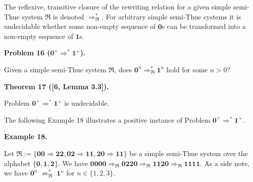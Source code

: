  
 
 
The reflexive, transitive closure of the rewriting relation for a given simple semi-Thue system $\mathfrak{R}$ is denoted $\Rightarrow_{\mathfrak{R}}^{*}$. For arbitrary simple semi-Thue systems it is undecidable whether some non-empty sequence of $\mathbf{0}$s can be transformed into a non-empty sequence of $\mathbf{1}$s.\par
 
 
 
\par\medskip\noindent\textbf{Problem 16 ($\mathbf{0}^{+}\Rightarrow^{*}\mathbf{1}^{+}$).}\par
 
 
Given a simple semi-Thue system $\mathfrak{R}$, does $\mathbf{0}^{n}\Rightarrow^{*}_{\mathfrak{R}}\mathbf{1}^{n}$ hold for some $n>0$?\par
 
 
 
 
\par\medskip\noindent\textbf{Theorem 17 ([6, Lemma 3.3]).}\par
 
 
Problem $\mathbf{0}^{+}\Rightarrow^{*}\mathbf{1}^{+}$ is undecidable.\par
 
 
 
 
The following Example 18 illustrates a positive instance of Problem $\mathbf{0}^{+}\Rightarrow^{*}\mathbf{1}^{+}$.\par
 
 
 
\par\medskip\noindent\textbf{Example 18.}\par
 
 
Let $\mathfrak{R}:=\{\mathbf{0}\mathbf{0}\Rightarrow\mathbf{2}\mathbf{2},\mathbf{0}%
\mathbf{2}\Rightarrow\mathbf{1}\mathbf{1},\mathbf{2}\mathbf{0}\Rightarrow%
\mathbf{1}\mathbf{1}\}$ be a simple semi-Thue system over the alphabet $\{\mathbf{0},\mathbf{1},\mathbf{2}\}$. We have $\mathbf{0}\mathbf{0}\mathbf{0}\mathbf{0}\Rightarrow_{\mathfrak{R}}\mathbf{0}%
\mathbf{2}\mathbf{2}\mathbf{0}\Rightarrow_{\mathfrak{R}}\mathbf{1}\mathbf{1}%
\mathbf{2}\mathbf{0}\Rightarrow_{\mathfrak{R}}\mathbf{1}\mathbf{1}\mathbf{1}%
\mathbf{1}$. As a side note, we have $\mathbf{0}^{n}\;{\not\Rightarrow}_{\mathfrak{R}}^{*}\;\mathbf{1}^{n}$ for $n\in\{1,2,3\}$.\par
 
